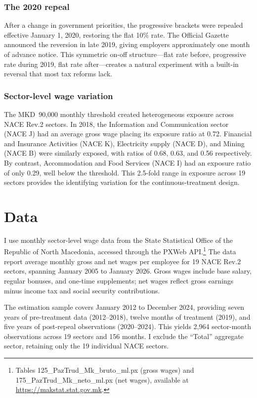 \documentclass[12pt]{article}
\begin{document}
\subsubsection*{The 2020 repeal} After a change in government priorities, the progressive brackets were repealed effective January 1, 2020, restoring the flat 10\% rate. The Official Gazette announced the reversion in late 2019, giving employers approximately one month of advance notice. This symmetric on-off structure---flat rate before, progressive rate during 2019, flat rate after---creates a natural experiment with a built-in reversal that most tax reforms lack.

\subsubsection*{Sector-level wage variation} The MKD~90,000 monthly threshold created heterogeneous exposure across NACE Rev.2 sectors. In 2018, the Information and Communication sector (NACE J) had an average gross wage placing its exposure ratio at 0.72. Financial and Insurance Activities (NACE K), Electricity supply (NACE D), and Mining (NACE B) were similarly exposed, with ratios of 0.68, 0.63, and 0.56 respectively. By contrast, Accommodation and Food Services (NACE I) had an exposure ratio of only 0.29, well below the threshold. This 2.5-fold range in exposure across 19 sectors provides the identifying variation for the continuous-treatment design.

\section{Data}

I use monthly sector-level wage data from the State Statistical Office of the Republic of North Macedonia, accessed through the PXWeb API.\footnote{Tables 125\_PazTrud\_Mk\_bruto\_ml.px (gross wages) and 175\_PazTrud\_Mk\_neto\_ml.px (net wages), available at \url{https://makstat.stat.gov.mk}.} The data report average monthly gross and net wages per employee for 19 NACE Rev.2 sectors, spanning January 2005 to January 2026. Gross wages include base salary, regular bonuses, and one-time supplements; net wages reflect gross earnings minus income tax and social security contributions.

The estimation sample covers January 2012 to December 2024, providing seven years of pre-treatment data (2012--2018), twelve months of treatment (2019), and five years of post-repeal observations (2020--2024). This yields 2,964 sector-month observations across 19 sectors and 156 months. I exclude the ``Total'' aggregate sector, retaining only the 19 individual NACE sectors.
\end{document}
